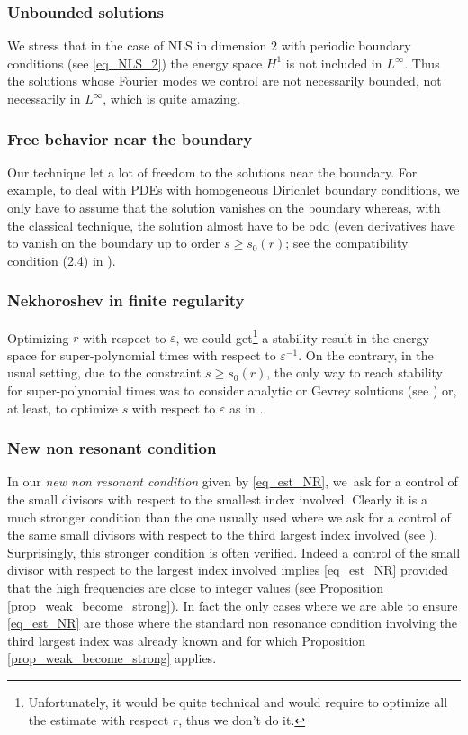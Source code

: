 \documentclass[JEP,XML,SOM,Unicode,NoEqCountersInSection,published]{cedram}
\theoremstyle{definition}
\begin{document}
\subsubsection*{Unbounded solutions}
We stress that in the case of NLS in dimension $2$ with periodic boundary conditions (see \eqref{eq_NLS_2}) the energy space $H^1$ is not included in $L^\infty$. Thus the solutions whose Fourier modes we control are not necessarily bounded, \ie not necessarily in $L^\infty$, which is quite amazing.

\subsubsection*{Free behavior near the boundary}
Our technique let a lot of freedom to the solutions near the boundary. For example, to deal with PDEs with homogeneous Dirichlet boundary conditions, we only have to assume that the solution vanishes on the boundary whereas, with the classical technique, the solution almost have to be odd (\ie even derivatives have to vanish on the boundary up to order $s\geq s_0(r)$; see \eg the compatibility condition (2.4) in \cite{Bam03}).

\subsubsection*{Nekhoroshev in finite regularity}
Optimizing $r$ with respect to $\varepsilon$, we could get\footnote{Unfortunately, it would be quite technical and would require to optimize all the estimate with respect $r$, thus we don't do it.} a stability result in the energy space for super-polynomial times with respect to $\varepsilon^{-1}$. On the contrary, in the usual setting, due to the constraint $s\geq s_0(r)$, the only way to reach stability for super-polynomial times was to consider analytic or Gevrey solutions (see \cite{FG13,BMP20}) or, at least, to optimize $s$ with respect to $\varepsilon$ as in \cite{BMP20}.

\subsubsection*{New non resonant condition}
In our {\it new non resonant condition} given by \eqref{eq_est_NR}, we~ask for a control of the small divisors with respect to the smallest index involved. Clearly it is a much stronger condition than the one usually used where we ask for a control of the same small divisors with respect to the third largest index involved (see \cite{BG06}). Surprisingly, this stronger condition is often verified. Indeed a control of the small divisor with respect to the largest index involved implies \eqref{eq_est_NR} provided that the high frequencies are close to integer values (see Proposition \ref{prop_weak_become_strong}). In fact the only cases where we are able to ensure \eqref{eq_est_NR} are those where the standard non resonance condition involving the third largest index was already known and for which Proposition \ref{prop_weak_become_strong} applies.
\end{document}
